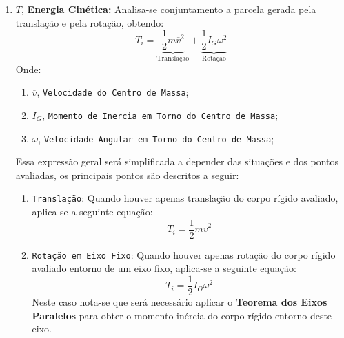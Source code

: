 \documentclass{article}
\begin{document}
\begin{enumerate}[rightmargin = \leftmargin]
                    \item $T$, \textbf{Energia Cinética:} Analisa-se conjuntamento a parcela gerada pela translação e pela rotação, obtendo:
                        \begin{equation}
                            \boxed{
                                T_{i} = 
                                \underbrace{
                                    \frac{1}{2} m\overline{v}^{2}
                                }_{\text{Translação}} + 
                                \underbrace{
                                    \frac{1}{2}I_{G}\omega^{2}
                                }_{\text{Rotação}}
                            }
                        \end{equation}
                    Onde:
                        \begin{enumerate}[rightmargin = \leftmargin, noitemsep]
                            \item $\overline{v}$, \texttt{Velocidade do Centro de Massa};
                            \item $I_{G}$, \texttt{Momento de Inercia em Torno do Centro de Massa};
                            \item $\omega$, \texttt{Velocidade Angular em Torno do Centro de Massa};
                        \end{enumerate}
                    Essa expressão geral será simplificada a depender das situações e dos pontos avaliadas, os principais pontos são descritos a seguir:
                        \begin{enumerate}[rightmargin = \leftmargin]
                            \item \texttt{Translação}: Quando houver apenas translação do corpo rígido avaliado, aplica-se a seguinte equação:
                                \begin{equation}
                                    \boxed{
                                        T_{i} = \frac{1}{2}m\overline{v}^{2}
                                    }
                                \end{equation}
                                
                            \item \texttt{Rotação em Eixo Fixo}: Quando houver apenas rotação do corpo rígido avaliado entorno de um eixo fixo, aplica-se a seguinte equação:
                                \begin{equation}
                                    \boxed{
                                        T_{i} = \frac{1}{2}I_{O}\omega^{2}
                                    }
                                \end{equation}
                            Neste caso nota-se que será necessário aplicar o \textbf{Teorema dos Eixos Paralelos} para obter o momento inércia do corpo rígido entorno deste eixo.
                                

\end{enumerate}
\end{enumerate}
\end{document}
